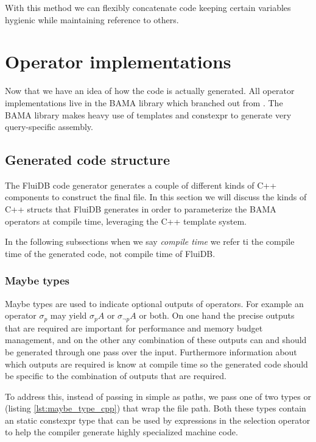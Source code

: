 With this method we can flexibly concatenate code keeping certain
variables hygienic while maintaining reference to others.

\section{Operator implementations}

Now that we have an idea of how the code is actually generated. All
operator implementations live in the BAMA library which branched out
from \cite{krikellasGeneratingCodeHolistic2010}. The BAMA library makes
heavy use of templates and constexpr to generate very query-specific
assembly.

\subsection{Generated code structure}

The FluiDB code generator generates a couple of different kinds of C++
components to construct the final file. In this section we will
discuss the kinds of C++ structs that FluiDB generates in order to
parameterize the BAMA operators at compile time, leveraging the C++
template system.

In the following subsections when we say \emph{compile time} we refer ti
the compile time of the generated code, not compile time of FluiDB.

\subsubsection{Maybe types}

Maybe types are used to indicate optional outputs of operators. For
example an operator \(\sigma_p\) may yield \(\sigma_p A\) or
\(\sigma_{\neg p} A\) or both. On one hand the precise outputs that
are required are important for performance and memory budget
management, and on the other any combination of these outputs can and
should be generated through one pass over the input. Furthermore
information about which outputs are required is know at compile time
so the generated code should be specific to the combination of outputs
that are required.

To address this, instead of passing in simple  as
paths, we pass one of two types  or  (listing
\ref{lst:maybe_type_cpp}) that wrap the file path. Both these types
contain an  static constexpr type that can be used by
 expressions in the selection operator to help
the compiler generate highly specialized machine code.

